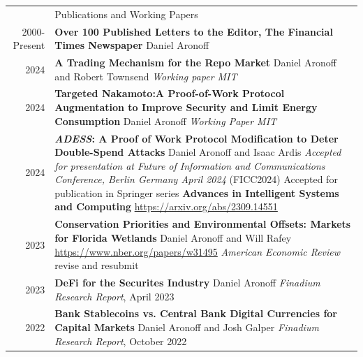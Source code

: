 \documentclass[letterpaper, 11pt]{article}
\newcommand{\headingfont}{\Large\color{OliveGreen}}
\newenvironment{SectionTable}[1]{
	\renewcommand*{\arraystretch}{1.7}
	\setlength{\tabcolsep}{10pt}
	\begin{longtable}{Rp{5.2in}} & #1 \\}
{\end{longtable}\vspace{-.3cm}}
\begin{document}
\begin{SectionTable}{\headingfont Publications and Working Papers} 

2000- Present & 
\textbf{Over 100 Published Letters to the Editor, The Financial Times Newspaper} \newline
Daniel Aronoff \\

2024 &
\textbf{A Trading Mechanism for the Repo Market} \newline
Daniel Aronoff and Robert Townsend \newline
\textit{Working paper MIT}\\

2024 &
\textbf{Targeted Nakamoto:A Proof-of-Work Protocol Augmentation to Improve Security and Limit Energy Consumption} \newline
Daniel Aronoff \newline
\textit{Working Paper MIT}\\

2024 & 
\textbf{\textit{ADESS}: A Proof of Work Protocol Modification to Deter Double-Spend Attacks} \newline
Daniel Aronoff and Isaac Ardis \newline
\textit{Accepted for presentation at Future of Information and Communications Conference, Berlin Germany April 2024} (FICC2024)\newline
Accepted for publication in Springer series \textbf{Advances in Intelligent Systems and Computing}\newline
{\small{\url{https://arxiv.org/abs/2309.14551}}}\\

2023 &
\textbf{Conservation Priorities and Environmental Offsets: Markets for Florida Wetlands} \newline
Daniel Aronoff and Will Rafey \newline
{\small{\url{https://www.nber.org/papers/w31495}}}\newline  
\textit{American Economic Review} revise and resubmit\\

2023 &
\textbf{DeFi for the Securites Industry}\newline
Daniel Aronoff\newline
\textit{Finadium Research Report}, April 2023\\


2022 &
\textbf{Bank Stablecoins vs. Central Bank Digital Currencies for Capital Markets}\newline
Daniel Aronoff and Josh Galper\newline
\textit{Finadium Research Report}, October 2022\\


\end{SectionTable}
\end{document}
